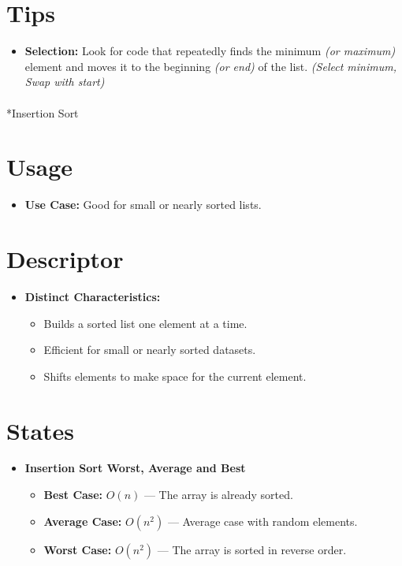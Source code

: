\documentclass[
  letterpaper,
  DIV=11,
  numbers=noendperiod]{scrreprt}
\makeatletter
\let\oldparagraph\paragraph
\renewcommand{\paragraph}{
    \@ifstar
      \xxxParagraphStar
      \xxxParagraphNoStar
  }
\newcommand{\xxxParagraphStar}[1]{\oldparagraph*{#1}\mbox{}}
\newcommand{\xxxParagraphNoStar}[1]{\oldparagraph{#1}\mbox{}}
\providecommand{\tightlist}{%
  \setlength{\itemsep}{0pt}\setlength{\parskip}{0pt}}
\makeatother
\begin{document}
\section{Tips}

\begin{itemize}
\tightlist
\item
  \textbf{Selection:} Look for code that repeatedly finds the minimum
  \emph{(or maximum)} element and moves it to the beginning \emph{(or
  end)} of the list. \emph{(Select minimum, Swap with start)}
\end{itemize}

\paragraph*{Insertion Sort}\label{insertion-sort}

\section{Usage}

\begin{itemize}
\tightlist
\item
  \textbf{Use Case:} Good for small or nearly sorted lists.
\end{itemize}

\section{Descriptor}

\begin{itemize}
\item
  \textbf{Distinct Characteristics:}

  \begin{itemize}
  \tightlist
  \item
    Builds a sorted list one element at a time.
  \item
    Efficient for small or nearly sorted datasets.
  \item
    Shifts elements to make space for the current element.
  \end{itemize}
\end{itemize}

\section{States}

\begin{itemize}
\item
  \textbf{Insertion Sort Worst, Average and Best}

  \begin{itemize}
  \tightlist
  \item
    \textbf{Best Case:} \(O(n)\) --- The array is already sorted.
  \item
    \textbf{Average Case:} \(O(n^2)\) --- Average case with random
    elements.
  \item
    \textbf{Worst Case:} \(O(n^2)\) --- The array is sorted in reverse
    order.
  \end{itemize}
\end{itemize}
\end{document}
